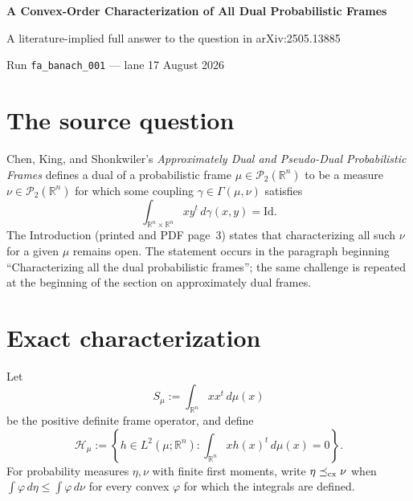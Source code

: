 \documentclass[11pt]{article}
\newcommand{\R}{\mathbb{R}}
\newcommand{\Ptwo}{\mathcal P_2(\R^n)}
\newcommand{\Id}{\mathrm{Id}}
\begin{document}
\begin{center}
{\Large\bfseries A Convex-Order Characterization of All Dual Probabilistic Frames}\par
\vspace{0.5em}
{\large A literature-implied full answer to the question in arXiv:2505.13885}\par
\vspace{0.4em}
Run \texttt{fa\_banach\_001} --- lane 17  August 2026
\end{center}

\medskip
\noindent{}

\section{The source question}

Chen, King, and Shonkwiler's \emph{Approximately Dual and Pseudo-Dual
Probabilistic Frames} \cite{CKS} defines a dual of a probabilistic frame
$\mu\in\Ptwo$ to be a measure $\nu\in\Ptwo$ for which some coupling
$\gamma\in\Gamma(\mu,\nu)$ satisfies
\begin{equation}\label{eq:dual}
 \int_{\R^n\times\R^n}xy^t\,d\gamma(x,y)=\Id.
\end{equation}
The Introduction (printed and PDF page~3) states that characterizing all such
$\nu$ for a given $\mu$ remains open. The statement occurs in the paragraph beginning
``Characterizing all the dual probabilistic frames''; the same challenge is
repeated at the beginning of the section on approximately dual frames.

\section{Exact characterization}

Let
\[
 S_\mu:=\int_{\R^n}xx^t\,d\mu(x)
\]
be the positive definite frame operator, and define
\[
 \mathcal H_\mu:=\left\{h\in L^2(\mu;\R^n):
       \int_{\R^n}x h(x)^t\,d\mu(x)=0\right\}.
\]
For probability measures $\eta,\nu$ with finite first moments, write
$\eta\preceq_{\rm cx}\nu$ when
$\int\varphi\,d\eta\leq\int\varphi\,d\nu$ for every convex $\varphi$
for which the integrals are defined.
\end{document}
